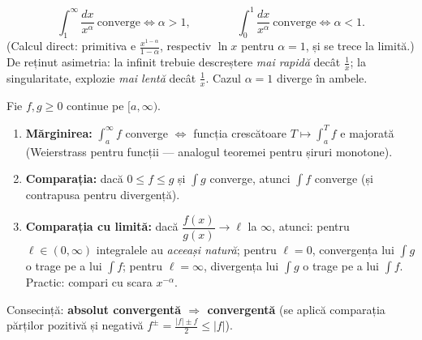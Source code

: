 \begin{teorema}
\[
\int_1^{\infty}\frac{dx}{x^{\alpha}}\ \text{converge}\iff\alpha>1,
\qquad\qquad
\int_0^{1}\frac{dx}{x^{\alpha}}\ \text{converge}\iff\alpha<1.
\]
(Calcul direct: primitiva e $\frac{x^{1-\alpha}}{1-\alpha}$, respectiv $\ln x$ pentru $\alpha=1$, și se trece la limită.) De reținut asimetria: la infinit trebuie descreștere \emph{mai rapidă} decât $\frac1x$; la singularitate, explozie \emph{mai lentă} decât $\frac1x$. Cazul $\alpha=1$ diverge în ambele.
\end{teorema}

\begin{teorema}
Fie $f,g\ge0$ continue pe $[a,\infty)$.
\begin{enumerate}[leftmargin=*, itemsep=1pt]
\item \textbf{Mărginirea:} $\int_a^\infty f$ converge $\iff$ funcția crescătoare $T\mapsto\int_a^T f$ e majorată (Weierstrass pentru funcții --- analogul teoremei pentru șiruri monotone).
\item \textbf{Comparația:} dacă $0\le f\le g$ și $\int g$ converge, atunci $\int f$ converge (și contrapusa pentru divergență).
\item \textbf{Comparația cu limită:} dacă $\dfrac{f(x)}{g(x)}\to\ell$ la $\infty$, atunci: pentru $\ell\in(0,\infty)$ integralele au \emph{aceeași natură}; pentru $\ell=0$, convergența lui $\int g$ o trage pe a lui $\int f$; pentru $\ell=\infty$, divergența lui $\int g$ o trage pe a lui $\int f$. Practic: compari cu scara $x^{-\alpha}$.
\end{enumerate}
Consecință: \textbf{absolut convergentă $\Rightarrow$ convergentă} (se aplică comparația părților pozitivă și negativă $f^{\pm}=\frac{|f|\pm f}{2}\le|f|$).
\end{teorema}

